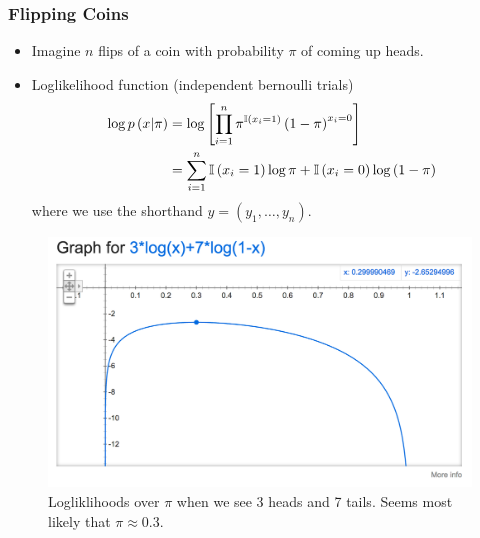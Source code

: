 \documentclass[10pt,mathserif]{beamer}
\begin{document}
\begin{frame}
  \frametitle{Flipping Coins}
  \begin{itemize}
  \item Imagine $n$ flips of a coin with probability $\pi$ of coming up heads.
  \item Loglikelihood function (independent bernoulli trials)
    \begin{align*}
      \log p\left(x \vert \pi \right) &= \log \left[\prod_{i = 1}^{n} \pi^{\mathbb{I}\left({x_i = 1}\right)}\left(1 - \pi\right)^{x_i = 0}\right] \\
      &= \sum_{i = 1}^{n} \mathbb{I}\left({x_i = 1}\right)\log \pi + \mathbb{I}\left({x_i = 0}\right)\log\left(1 - \pi\right)
    \end{align*}
    where we use the shorthand $y = \left(y_1, \dots, y_n\right)$.
  \end{itemize} 
  \begin{figure}[ht]
    \centering
    \includegraphics[width=0.3\paperwidth]{figure/loglikelihood_bernoulli_10}
    \caption{Logliklihoods over $\pi$ when we see 3 heads and 7 tails. Seems
      most likely that $\pi \approx 0.3$. \label{fig:loglikelihood_bernoulli_10} }
  \end{figure}
\end{frame}
\end{document}
